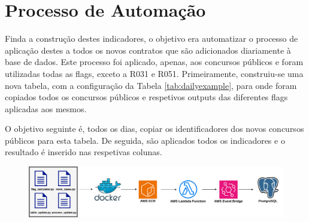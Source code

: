 \section{Processo de Automação}

Finda a construção destes indicadores, o objetivo era automatizar o processo de aplicação destes a todos os novos contratos que são adicionados diariamente à base de dados. Este processo foi aplicado, apenas, aos concursos públicos e foram utilizadas todas as flags, exceto a R031 e R051. Primeiramente, construiu-se uma nova tabela, com a configuração da Tabela \ref{tab:dailyexample}, para onde foram copiados todos os concursos públicos e respetivos outputs das diferentes flags aplicadas aos mesmos. 


\begin{table}[H]
	\centering
	\renewcommand{\arraystretch}{1.15}
	\setlength{\tabcolsep}{15pt}
	\caption{Exemplo de aplicação de todos os indicadores binários a um concurso público.}
	\label{tab:dailyexample}
\end{table}

O objetivo seguinte é, todos os dias, copiar os identificadores dos novos concursos públicos para esta tabela. De seguida, são aplicados todos os indicadores e o resultado é inserido nas respetivas colunas. 

\begin{figure}[H]
	\centering
	\includegraphics[width=\textwidth]{imagens/daily_flags_v2.png}
	\caption{}
	\label{}
\end{figure}

































